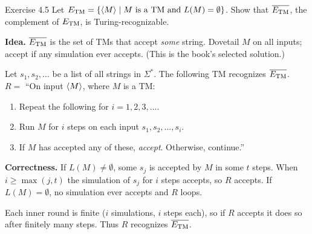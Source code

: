 \begin{question}{Exercise 4.5}
Let $E_{\mathrm{TM}}=\{\langle M\rangle\mid\text{$M$ is a TM and $L(M)=\emptyset$}\}$. Show that $\overline{E_{\mathrm{TM}}}$, the complement of $E_{\mathrm{TM}}$, is Turing-recognizable.
\end{question}
\begin{soln}
\textbf{Idea.} $\overline{E_{\mathrm{TM}}}$ is the set of TMs that accept \emph{some} string. Dovetail $M$ on all inputs; accept if any simulation ever accepts. (This is the book's selected solution.)

Let $s_1,s_2,\dots$ be a list of all strings in $\Sigma^*$. The following TM recognizes $\overline{E_{\mathrm{TM}}}$.
$R=$ ``On input $\langle M\rangle$, where $M$ is a TM:
\begin{enumerate}
\item Repeat the following for $i=1,2,3,\dots$.
\item Run $M$ for $i$ steps on each input $s_1,s_2,\dots,s_i$.
\item If $M$ has accepted any of these, \emph{accept}. Otherwise, continue.''
\end{enumerate}

\textbf{Correctness.} If $L(M)\ne\emptyset$, some $s_j$ is accepted by $M$ in some $t$ steps. When $i\ge\max(j,t)$ the simulation of $s_j$ for $i$ steps accepts, so $R$ accepts. If $L(M)=\emptyset$, no simulation ever accepts and $R$ loops.

Each inner round is finite ($i$ simulations, $i$ steps each), so if $R$ accepts it does so after finitely many steps. Thus $R$ recognizes $\overline{E_{\mathrm{TM}}}$.
\end{soln}

